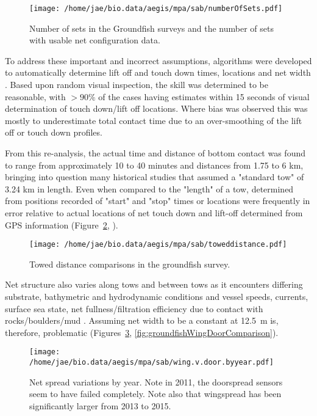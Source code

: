 \documentclass[letterpaper,portrait,11pt]{scrartcl}
\numberwithin{equation}{section}    %
\numberwithin{figure}{section}    %
\numberwithin{table}{section}       %
\begin{document}
\begin{figure}
  \centering
  \texttt{[image: /home/jae/bio.data/aegis/mpa/sab/numberOfSets.pdf]}
  \caption{Number of sets in the Groundfish surveys and the number of sets with usable net configuration data.}
  \label{fig:groundfishNoSets}
\end{figure}

To address these important and incorrect assumptions, algorithms were developed to automatically determine lift off and touch down times, locations and net width \parencite{Munden:2017nets}. Based upon random visual inspection, the skill was determined to be reasonable, with $>90\%$ of the cases having estimates within 15 seconds of visual determination of touch down/lift off locations. Where bias was observed this was mostly to underestimate total contact time due to an over-smoothing of the lift off or touch down profiles.

From this re-analysis, the actual time and distance of bottom contact was found to range from approximately 10 to 40 minutes and distances from 1.75 to 6 km, bringing into question many historical studies that assumed a "standard tow" of 3.24 km in length. Even when compared to the "length" of a tow, determined from positions recorded of "start" and "stop" times or locations were frequently in error relative to actual locations of net touch down and lift-off determined from GPS information (Figure~\ref{fig:groundfishTowDistance}, \textcite{Munden:2017nets}). 


\begin{figure}
  \centering
  \texttt{[image: /home/jae/bio.data/aegis/mpa/sab/toweddistance.pdf]}
  \caption{Towed distance comparisons in the groundfish survey.}
  \label{fig:groundfishTowDistance}
\end{figure}

Net structure also varies along tows and between tows as it encounters differing substrate, bathymetric and hydrodynamic conditions and vessel speeds, currents, surface sea state, net fullness/filtration efficiency due to contact with rocks/boulders/mud \parencite{Munden:2017nets}. Assuming net width to be a constant at 12.5~m is, therefore, problematic (Figures~\ref{fig:groundfishWingDoorAnnual}, \ref{fig:groundfishWingDoorComparison}).
 



\begin{figure}
  \centering
  \texttt{[image: /home/jae/bio.data/aegis/mpa/sab/wing.v.door.byyear.pdf]}
  \caption{Net spread variations by year. Note in 2011, the doorspread sensors seem to have failed completely. Note also that wingspread has been significantly larger from 2013 to 2015.}
  \label{fig:groundfishWingDoorAnnual}
\end{figure}
\end{document}
